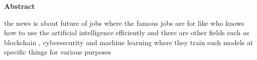 \documentclass[10pt,a4paper]{article}
\begin{document}
\begin{center}
\LARGE \textbf{Abstract}
\end{center}
the news is about future of jobs where the famous jobs are for like who knows how to use the artificial intelligence efficiently
and there are other fields such as blockchain , cybersecurity and machine learning where they train such models at specific things for various purposes
\end{document}
